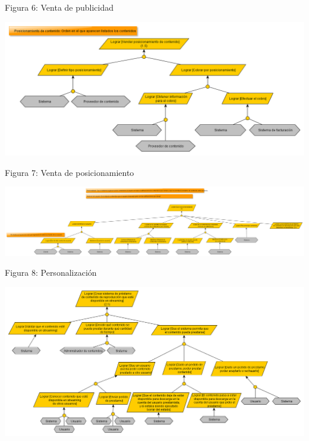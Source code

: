 \documentclass[11pt, a4paper, spanish]{article}
\begin{document}
	\begin{center}
		\small{Figura 6: Venta de publicidad}
	\end{center}
\newpage
	\begin{center}
		\includegraphics[scale=0.61, angle=90]{Diagramas/1-5ModelodeObjetivosVenderposicionamiento.png}
	\end{center}
	\begin{center}
		\small{Figura 7: Venta de posicionamiento}
	\end{center}
\newpage
	\begin{center}
		\includegraphics[scale=0.27, angle=90]{Diagramas/2ModelodeObjetivosPersonalizado.png}
	\end{center}
	\begin{center}
		\small{Figura 8: Personalizaci\'on}
	\end{center}
\newpage
	\begin{center}
		\includegraphics[scale=0.55, angle=90]{Diagramas/2-1ModelodeObjetivosPrestamocontenidos.png}
	\end{center}
\end{document}
